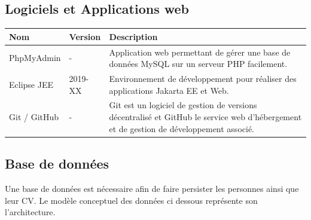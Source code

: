 \subsection{\textbf{Logiciels et Applications web}}
\noindent
\begin{tabular}{!{\color{white}\vrule}m{3.4cm}!{\color{white}\vrule}m{1.7cm}!{\color{white}\vrule}m{10.8cm}!{\color{white}\vrule}}


\hline
 \color{white} Nom & \color{white} Version & \color{white} Description\\

\hline
{} PhpMyAdmin & - & Application web permettant de gérer une base de données MySQL sur un serveur PHP facilement. \\

\hline
{} Eclipse JEE & 2019-XX & Environnement de développement pour réaliser des applications Jakarta EE et Web. \\

\hline
{} Git / GitHub & - & Git est un logiciel de gestion de versions décentralisé et GitHub le service web d'hébergement et de gestion de développement associé. \\

\hline

\end{tabular}

\subsection{\textbf{Base de données}}
	Une base de données est nécessaire afin de faire persister les personnes ainsi que leur CV. Le modèle conceptuel des données ci dessous représente son l'architecture.